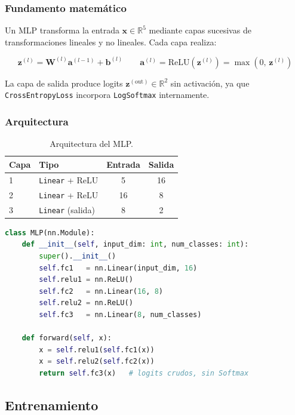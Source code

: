 \documentclass[12pt,a4paper]{article}
\begin{document}
\subsubsection{Fundamento matemático}

Un MLP transforma la entrada $\mathbf{x} \in \mathbb{R}^5$ mediante capas
sucesivas de transformaciones lineales y no lineales. Cada capa realiza:

\[
  \mathbf{z}^{(l)} = \mathbf{W}^{(l)} \mathbf{a}^{(l-1)} + \mathbf{b}^{(l)}
  \qquad
  \mathbf{a}^{(l)} = \text{ReLU}(\mathbf{z}^{(l)}) = \max(0,\, \mathbf{z}^{(l)})
\]

La capa de salida produce logits $\mathbf{z}^{(\text{out})} \in \mathbb{R}^2$
sin activación, ya que \texttt{CrossEntropyLoss} incorpora \texttt{LogSoftmax}
internamente.

\subsubsection{Arquitectura}

\begin{table}[H]
  \centering
  \begin{tabular}{llcc}
    \toprule
    \textbf{Capa} & \textbf{Tipo} & \textbf{Entrada} & \textbf{Salida} \\
    \midrule
    1 & \texttt{Linear} + ReLU  & 5  & 16 \\
    2 & \texttt{Linear} + ReLU  & 16 & 8  \\
    3 & \texttt{Linear} (salida) & 8 & 2  \\
    \bottomrule
  \end{tabular}
  \caption{Arquitectura del MLP.}
\end{table}

\begin{lstlisting}[language=Python, caption={Definición del MLP (\texttt{model.py})}]
class MLP(nn.Module):
    def __init__(self, input_dim: int, num_classes: int):
        super().__init__()
        self.fc1   = nn.Linear(input_dim, 16)
        self.relu1 = nn.ReLU()
        self.fc2   = nn.Linear(16, 8)
        self.relu2 = nn.ReLU()
        self.fc3   = nn.Linear(8, num_classes)

    def forward(self, x):
        x = self.relu1(self.fc1(x))
        x = self.relu2(self.fc2(x))
        return self.fc3(x)   # logits crudos, sin Softmax
\end{lstlisting}

\subsection{Entrenamiento}
\end{document}
